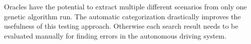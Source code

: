 Oracles have the potential to extract multiple different scenarios from only one genetic algorithm run. The automatic categorization drastically improves the usefulness of this testing approach. Otherwise each search result needs to be evaluated manually for finding errors in the autonomous driving system.
